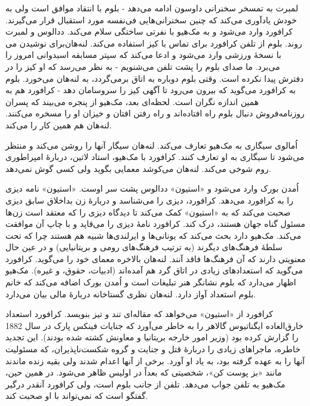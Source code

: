 \documentclass[12pt]{book}
\newcommand{\noun}[1]{«{#1}»}
\begin{document}
    لمبرت به تمسخر سخنرانی داوسون ادامه می‌دهد - بلوم با انتقاد موافق است ولی به خودش یادآوری می‌کند که چنین سخنرانی‌هایی فی‌نفسه مورد استقبال قرار می‌گیرند. کرافورد وارد می‌شود و به مک‌هیو با نفرتی ساختگی سلام می‌کند. ددالوس و لمبرت برای نوشیدن می‎‌روند. بلوم از تلفن کرافورد برای تماس با کیز استفاده می‌کند. لنه‌هان با نسخۀ ورزشی وارد می‌شود و ادعا می‌کند که سپتر مسابقه اسبدوانی امروز را می‌برد. ما صدای بلوم را پشت تلفن می‌شنویم - به نظر می‌رسد که او کیز را در دفترش پیدا نکرده است. وقتی بلوم دوباره به اتاق برمی‌گردد، به لنه‌هان می‌خورد. بلوم به کرافورد می‌گوید که بیرون می‌رود تا آگهی کیز را سروسامان دهد - کرافورد هم به همین اندازه نگران است. لحظه‌ای بعد، مک‌هیو از پنجره می‌بیند که پسران روزنامه‌فروش دنبال بلوم راه افتاده‌اند و راه رفتن افتان و خیزان او را مسخره می‌کنند. لنه‌هان هم همین کار را می‌کند.

    اُمالوی سیگاری به مک‌هیو تعارف می‌کند. لنه‌هان سیگار آنها را روشن می‌کند و منتظر می‌شود تا سیگاری به او تعارف کنند. کرافورد با مک‌هیو، استاد لاتین، دربارۀ امپراطوری روم شوخی می‌کند. لنه‌هان می‌کوشد معمایی بگوید ولی کسی گوش نمی‌دهد.

    اُمدن بورک وارد می‌شود و \noun{استیون} ددالوس پشت سر اوست. \noun{استیون} نامه دیزی را به کرافورد می‌دهد. کرافورد، دیزی را می‌شناسد و دربارۀ زن بداخلاق سابق دیزی صحبت می‌کند که به \noun{استیون} کمک می‌کند تا دیدگاه دیزی را که معتقد است زن‌ها مسئول گناه جهان هستند، درک کند. کرافورد نامۀ دیزی را می‌قاپد و با چاپ آن موافقت می‌کند. مک‌هیو دارد بحث می‌کند که یونانی‌ها و ایرلندی‌ها شبیه هم هستند چرا که تحت سلطۀ فرهنگ‌های دیگرند (به ترتیب فرهنگ‌های رومی و بریتانیایی) و در عین حال معنویتی دارند که آن فرهنگ‌ها فاقد آنند. لنه‌هان بالاخره معمای خود را می‌گوید. کرافورد می‌گوید که استعدادهای زیادی در اتاق گرد هم آمده‌اند (ادبیات، حقوق، و غیره). مک‌هیو اظهار می‌دارد که بلوم نشانگر هنر تبلیغات است و اُمدن بورک اضافه می‌کند که خانم بلوم استعداد آواز دارد. لنه‌هان نظری گستاخانه دربارۀ مالی بیان می‌دارد.

    کرافورد از \noun{استیون} می‌خواهد که مقاله‌ای تند و تیز بنویسد. کرافورد استعداد خارق‌العاده ایگناتیوس گالاهر را به خاطر می‌آورد که جنایات فینکس پارک در سال 1882 را گزارش کرده بود (وزیر امور خارجه بریتانیا و معاونش کشته شده بودند).  این تجدید خاطره، ماجراهای زیادی را دربارۀ قتل و جنایت و گروه شکست‌ناپذیران، که مسئولیت آنها را به عهده گرفته بود، به یاد او آورد. برخی از آنها اعدام شدند ولی بقیه زنده ماندند مانند «بز پوست کن»، شخصیتی که بعداً در اولیس ظاهر می‌شود. در همین حین، مک‌هیو به تلفن جواب می‌دهد. تلفن از جانب بلوم است، ولی کرافورد آنقدر درگیر گفتگو است که نمی‌تواند با او صحبت کند.
\end{document}
